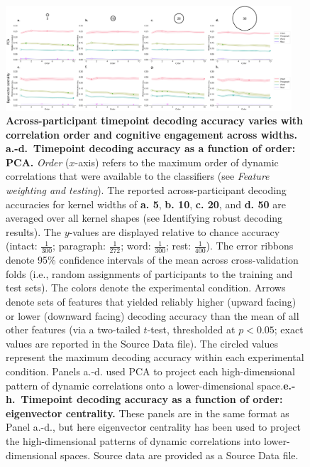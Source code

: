 \documentclass[english]{article}
\begin{document}
\begin{figure}[p!]
\centering
\includegraphics[width=0.95\textwidth]{figs/decode_levels_widths}
\caption{\textbf{Across-participant timepoint decoding accuracy varies with
      correlation order and cognitive engagement across widths.}
    \textbf{a.-d.~Timepoint decoding accuracy as a function of order:
      PCA.} \textit{Order} ($x$-axis) refers to the maximum order of dynamic
    correlations that were available to the classifiers (see
   \textit{Feature weighting and testing}).  The reported
    across-participant decoding accuracies for kernel widths of \textbf{a. 5},
    \textbf{b. 10}, \textbf{c. 20}, and \textbf{d. 50} are averaged over all
    kernel shapes (see Identifying robust decoding
      results).  The $y$-values are displayed relative to chance
    accuracy (intact: $\frac{1}{300}$; paragraph: $\frac{1}{272}$;
    word: $\frac{1}{300}$; rest: $\frac{1}{400}$).  The error ribbons
    denote 95\% confidence intervals of the mean across cross-validation folds
    (i.e., random assignments of participants to the training and test
    sets).  The colors denote the experimental condition.  Arrows
    denote sets of features that yielded reliably higher (upward
    facing) or lower (downward facing) decoding accuracy than the mean
    of all other features (via a two-tailed $t$-test, thresholded at
    $p < 0.05$; exact values are reported in the Source Data file).  The circled values represent
    the maximum decoding accuracy within each experimental condition.  Panels a.-d. used PCA to
    project each high-dimensional pattern of dynamic correlations onto
    a lower-dimensional space.\textbf{e.-h.~Timepoint decoding accuracy as a
      function of order: eigenvector centrality.} These panels are in the
    same format as Panel a.-d., but here eigenvector centrality has been
    used to project the high-dimensional patterns of dynamic
    correlations into lower-dimensional spaces.  Source data are provided as a Source Data file.}
\label{fig:supp_widths}
\end{figure}
\end{document}
